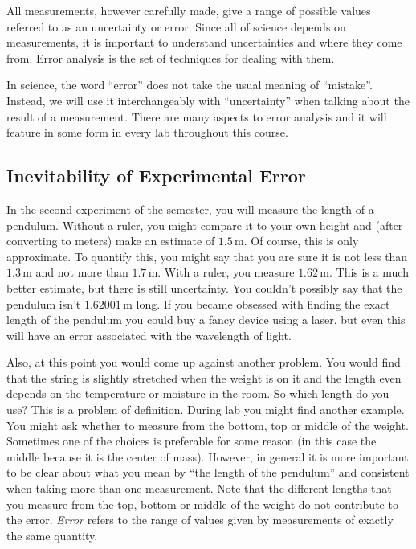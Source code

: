 All measurements, however carefully made, give a range of possible values referred to as an uncertainty or error. Since all of science depends on measurements, it is important to understand uncertainties and where they come from. Error analysis is the set of techniques for dealing with them.\myskip

In science, the word ``error'' does not take the usual meaning of ``mistake''. Instead, we will use it interchangeably with ``uncertainty'' when talking about the result of a measurement. There are many aspects to error analysis and it will feature in some form in every lab throughout this course.

\subsection{Inevitability of Experimental Error}

In the second experiment of the semester, you will measure the length of a pendulum. Without a ruler, you might compare it to your own height and (after converting to meters) make an estimate of $1.5\,\mathrm{m}$. Of course, this is only approximate. To quantify this, you might say that you are sure it is not less than $1.3\,\mathrm{m}$ and not more than $1.7\,\mathrm{m}$. With a ruler, you measure $1.62\,\mathrm{m}$. This is a much better estimate, but there is still uncertainty. You couldn't possibly say that the pendulum isn't $1.62001\,\mathrm{m}$ long. If you became obsessed with finding the exact length of the pendulum you could buy a fancy device using a laser, but even this will have an error associated with the wavelength of light.\myskip

Also, at this point you would come up against another problem. You would find that the string is slightly stretched when the weight is on it and the length even depends on the temperature or moisture in the room. So which length do you use? This is a problem of definition. During lab you might find another example. You might ask whether to measure from the bottom, top or middle of the weight. Sometimes one of the choices is preferable for some reason (in this case the middle because it is the center of mass). However, in general it is more important to be clear about what you mean by ``the length of the pendulum'' and consistent when taking more than one measurement. Note that the different lengths that you measure from the top, bottom or middle of the weight do not contribute to the error. \emph{Error} refers to the range of values given by measurements of exactly the same quantity.


